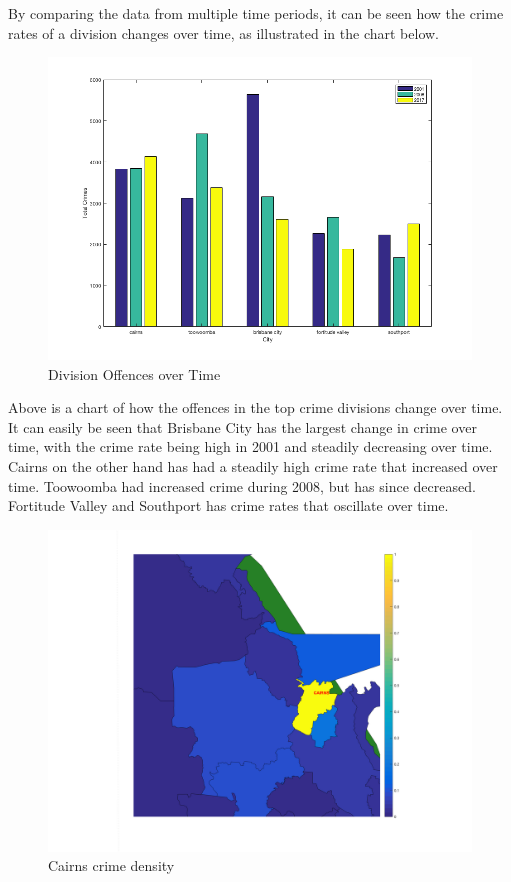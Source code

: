 \documentclass[]{article}
\begin{document}
By comparing the data from multiple time periods, it can be seen how the crime rates of a division changes over time, as illustrated in the chart below.

\begin{figure}[H]
    \caption{Division Offences over Time}
    \centering
    \includegraphics[width=\linewidth]{../images/top_crime_range}
\end{figure}

Above is a chart of how the offences in the top crime divisions change over time.
It can easily be seen that Brisbane City has the largest change in crime over time, with the crime rate being high in 2001 and steadily decreasing over time.
Cairns on the other hand has had a steadily high crime rate that increased over time.
Toowoomba had increased crime during 2008, but has since decreased.
Fortitude Valley and Southport has crime rates that oscillate over time.

\begin{figure}[H]
    \caption{Cairns crime density}
    \centering
    \label{fig:cairns_crime}
    \includegraphics[width=\linewidth]{../images/cairns_crime}
\end{figure}
\end{document}
